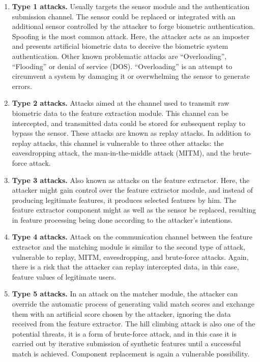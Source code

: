 \label{Security vulnerable points description}
\begin{enumerate}
    \item \textbf{Type 1 attacks.} Usually targets the sensor module and the authentication submission channel. The sensor could be replaced or integrated with an additional sensor controlled by the attacker to forge biometric authentication. Spoofing is the most common attack. Here, the attacker acts as an imposter and presents artificial biometric data to deceive the biometric system authentication. Other known problematic attacks are ``Overloading'', ``Flooding'' or denial of service (DOS). ``Overloading'' is an attempt to circumvent a system by damaging it or overwhelming the sensor to generate errors. 
     \item \textbf{Type 2 attacks.} Attacks aimed at the channel used to transmit raw biometric data to the feature extraction module. This channel can be intercepted, and transmitted data could be stored for subsequent replay to bypass the sensor. These attacks are known as replay attacks\cite{ReplayAttackDefinition}. In addition to replay attacks, this channel is vulnerable to three other attacks: the eavesdropping attack, the man-in-the-middle attack (MITM), and the brute-force attack.
     \item \textbf{Type 3 attacks.} Also known as attacks on the feature extractor. Here, the attacker might gain control over the feature extractor module, and instead of producing legitimate features, it produces selected features by him. The feature extractor component might as well as the sensor be replaced, resulting in feature processing being done according to the attacker's intentions.
     \item \textbf{Type 4 attacks.} Attack on the communication channel between the feature extractor and the matching module is similar to the second type of attack, vulnerable to replay, MITM, eavesdropping, and brute-force attacks. Again, there is a risk that the attacker can replay intercepted data, in this case, feature values of legitimate users.
    \item \textbf{Type 5 attacks.} In an attack on the matcher module, the attacker can override the automatic process of generating valid match scores and exchange them with an artificial score chosen by the attacker, ignoring the data received from the feature extractor. The hill climbing attack is also one of the potential threats, it is a form of brute-force attack, and in this case it is carried out by iterative submission of synthetic features until a successful match is achieved\cite{HillClimbingAttacks}. Component replacement is again a vulnerable possibility.

\end{enumerate}
